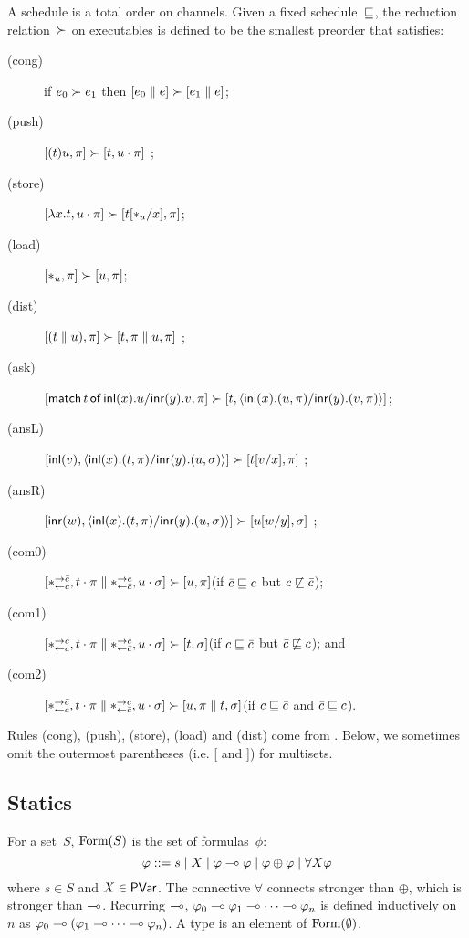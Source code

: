 A schedule is a total order on channels.
Given a fixed schedule~$\sqsubseteq$, the reduction relation~$\succ$
on executables
is defined to be the smallest preorder
that satisfies:
\begin{description}
 \item[(cong)] if
      $e_0         \succ e_1$
      then
      $[e_0 \parallel e] \succ [e_1\parallel e]$\enspace;
 \item[(push)]
	    $[(t)u,\pi]      \succ [t,u\cdot\pi]$      \enspace;
 \item[(store)]
	    $[\lambda x.t,u\cdot\pi]
	     \succ
	     [t[\ast_u/x],      \pi]$\enspace;
 \item[(load)]
	    $[\ast_u,\pi]\succ [u,\pi]$\enspace;
 \item[(dist)]
           $[(t\parallel u),\pi]  \succ [t,\pi\parallel u,\pi]$ \enspace;
 \item[(ask)]
      $[\mathsf{match}\,{t}\,\mathsf{of}\, \mathsf{inl}({x}). {u}/ \mathsf{inr}({y}). {v},\pi]\succ [t,\langle \mathsf{inl}({x}). ({u},{\pi})/ \mathsf{inr}({y}). ({v},{\pi})\rangle]$\enspace;
 \item[(ansL)]
           $[\mathsf{inl}({v}), \langle \mathsf{inl}({x}). ({t},{\pi})/ \mathsf{inr}({y}). ({u},{\sigma})\rangle] \succ [t[v/x],\pi] $ \enspace;
 \item[(ansR)]
           $[\mathsf{inr}({w}), \langle \mathsf{inl}({x}). ({t},{\pi})/ \mathsf{inr}({y}). ({u},{\sigma})\rangle] \succ [u[w/y],\sigma] $ \enspace;
 \item[(com0)]
           $[\ast^{\rightarrow {\bar{c}}}_{\leftarrow{c}}, t\cdot\pi\parallel \ast^{\rightarrow {c}}_{\leftarrow{\bar{c}}},
           u\cdot\sigma] \succ
           [u,\pi]$\enspace(if $\bar{c}\sqsubseteq c$ but $c\not\sqsubseteq \bar{c}$)\enspace;
 \item[(com1)]
	    $[\ast^{\rightarrow {\bar{c}}}_{\leftarrow{c}}, t\cdot\pi\parallel \ast^{\rightarrow {c}}_{\leftarrow{\bar{c}}},
	    u\cdot\sigma] \succ
	    [t,\sigma]$\enspace(if $c\sqsubseteq \bar{c}$ but $\bar{c}\not\sqsubseteq c$)\enspace; and
 \item[(com2)]
	    $[\ast^{\rightarrow {\bar{c}}}_{\leftarrow{c}}, t\cdot\pi\parallel \ast^{\rightarrow {c}}_{\leftarrow{\bar{c}}},
	    u\cdot\sigma] \succ
	    [u,\pi\parallel t,\sigma]$\enspace(if $c\sqsubseteq \bar{c}$ and $\bar{c}\sqsubseteq
       c$)\enspace.
\end{description}
Rules (cong), (push), (store), (load) and (dist) come from \citet{danos-krivine}.
Below, we sometimes omit the outermost parentheses (i.e. [ and ]) for multisets.



\subsection{Statics}
For a set~$S$,
$\mathop{\text{Form}}(S)$ is the set of formulas~$\phi$:
\[
\varphi::= s \mid X \mid \varphi\multimap\varphi\mid \varphi\oplus\varphi\mid
\forall X \varphi
\]
where $s\in S$ and $X\in \mathsf{PVar}$.
The connective $\forall$ connects stronger than $\oplus$, which is
stronger than $\multimap$.
Recurring $\multimap$,
$\varphi_0\multimap\varphi_1\multimap\cdots\multimap\varphi_n$ is defined inductively on~$n$
as
$\varphi_0\multimap(\varphi_1\multimap\cdots\multimap\varphi_n)$.
A type is an element of $\mathop{\text{Form}}(\emptyset)$.

